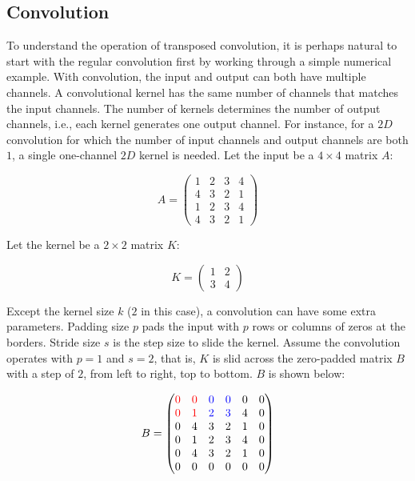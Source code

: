 \subsection{Convolution}

To understand the operation of transposed convolution, it is perhaps natural to start with the regular
convolution first by working through a simple numerical example. With convolution, the input and output
can both have multiple channels. A convolutional kernel has the same number of channels that matches the
input channels. The number of kernels determines the number of output channels, i.e., each
kernel generates one output channel. For instance, for a $2D$ convolution for which the number of input
channels and output channels are both $1$, a single one-channel $2D$ kernel is needed. Let the input be
a $4 \times 4$ matrix $A$:

$$
A =
  \begin{pmatrix}
    1 & 2 & 3 & 4 \\
    4 & 3 & 2 & 1 \\
    1 & 2 & 3 & 4 \\
    4 & 3 & 2 & 1
  \end{pmatrix}
$$

Let the kernel be a $2 \times 2$ matrix $K$:

$$
K =
  \begin{pmatrix}
    1 & 2 \\
    3 & 4
  \end{pmatrix}
$$

Except the kernel size $k$ ($2$ in this case),
a convolution can have some extra parameters. Padding size $p$ pads the input with $p$ rows or columns
of zeros at the borders. Stride size $s$ is the step size to slide the kernel. Assume the convolution operates
with $p = 1$ and $s = 2$, that is, $K$ is slid across the zero-padded matrix $B$ with a step of
$2$, from left to right, top to bottom. $B$ is shown below:

$$
B =
  \begin{pmatrix}
    {\color{red}0} & {\color{red}0} & {\color{blue}0} & {\color{blue}0} & 0 & 0 \\
    {\color{red}0} & {\color{red}1} & {\color{blue}2} & {\color{blue}3} & 4 & 0 \\
    0 & 4 & 3 & 2 & 1 & 0 \\
    0 & 1 & 2 & 3 & 4 & 0 \\
    0 & 4 & 3 & 2 & 1 & 0 \\
    0 & 0 & 0 & 0 & 0 & 0
  \end{pmatrix}
$$

